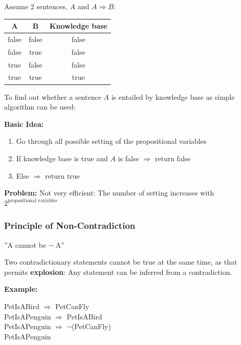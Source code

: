 \documentclass[
../EiKI_Summary.tex,
]
{subfiles}
\begin{document}
Assume 2 sentences, $A$ and $A \Rightarrow B$:

\begin{center}
	\begin{tabular}{|c|c|c|}
        \hline
        A & B & Knowledge base \\
        \hline\hline
        false & false & false \\
        false & true & false \\
        true & false & false \\
        true & true & true \\
        \hline
    \end{tabular}
\end{center}

To find out whether a sentence $A$ is entailed by knowledge base as simple algorithm can be used:

\textbf{Basic Idea:}
\begin{enumerate}
    \item Go through all possible setting of the propositional variables
    \item If knowledge base is true and $A$ is false $\Rightarrow$ return false
    \item Else $\Rightarrow$ return true
\end{enumerate}

\textbf{Problem:}
Not very efficient: The number of setting increases with $2^{\text{propositional variables}}$

\subsubsection{Principle of Non-Contradiction}
\begin{defbox*}
    \begin{center}
	''A cannot be $\neg$ A''
    \end{center}

    Two contradictionary statements cannot be true at the same time, as that permits \textbf{explosion}: Any statement can be inferred from a contradiction.
\end{defbox*}

\textbf{Example:}

PetIsABird $\Rightarrow$ PetCanFly\\
PetIsAPenguin $\Rightarrow$ PetIsABird\\
PetIsAPenguin $\Rightarrow$ $\neg$(PetCanFly)\\
PetIsAPenguin
\end{document}
